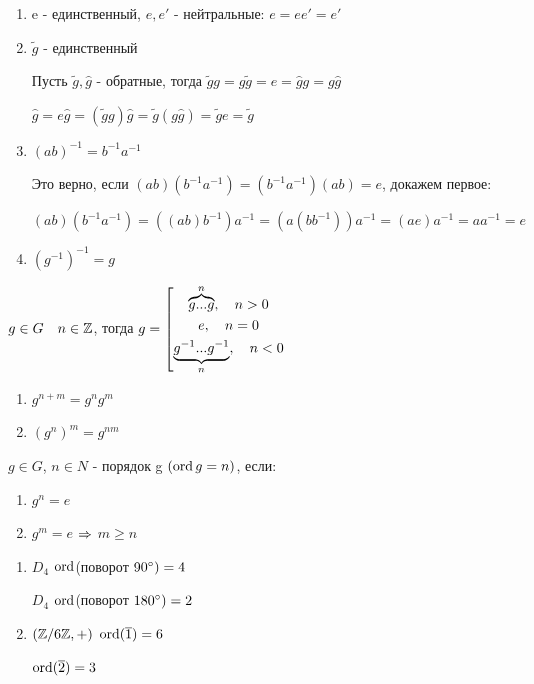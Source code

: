 \documentclass[12pt, fleqn]{article}
\begin{document}
\begin{properties}[групп]
    \begin{enumerate}
        \item e - единственный, $e,e'$ - нейтральные: $e=e e'=e'$
        \item $\widetilde{g}$ - единственный

        Пусть $\widetilde{g},\hat{g}$ - обратные, тогда $\widetilde{g}g = g\widetilde{g} = e = \hat{g}g = g\hat{g}$

        $\hat{g}=e \hat{g}=(\widetilde{g}g)\hat{g}=\widetilde{g}(g\hat{g})=\widetilde{g}e=\widetilde{g}$
        \item $(a b)^{-1}=b^{-1}a^{-1}$

        Это верно, если $(ab)(b^{-1}a^{-1})=(b^{-1}a^{-1})(ab)=e$, докажем первое:

        $(ab)(b^{-1}a^{-1})=((ab)b^{-1})a^{-1}=(a(b b^{-1}))a^{-1}=(a e)a^{-1}=a a^{-1}=e$
        \item $(g^{-1})^{-1}=g$
    \end{enumerate}
\end{properties}

\begin{definition}
    $g \in G \quad n \in \mathbb{Z}$, тогда $g=
\left[
  \begin{gathered}
    \overbrace{g...g}^n, \quad n>0\\
    e, \quad n=0\\
    \underbrace{g^{-1}...g^{-1}}_n, \quad n<0
  \end{gathered}
\right.$
\end{definition}

\begin{properties}[степени]
    \begin{enumerate}
    	\item $g^{n+m}=g^n g^m$
    	\item $(g^n)^m=g^{n m}$
	\end{enumerate}
\end{properties}

\begin{definition}
    $g \in G$, $n \in N$ - порядок g $(\mathop{\rm ord}\nolimits g = n)$, если:
    \begin{enumerate}
    	\item $g^n=e$
    	\item $g^m=e$ $\Rightarrow$ $m \geqslant n$
	\end{enumerate}
\end{definition}

\begin{example}
    \begin{enumerate}
    	\item $D_4$ $\mathop{\rm ord}\nolimits$(поворот $90\degree) =4$

    	$D_4$ $\mathop{\rm ord}\nolimits$(поворот $180\degree) =2$
    	\item $(\mathbb{Z} /6 \mathbb{Z}, +)$ $\mathop{\rm ord}\nolimits(\overline{1})=6$

    	$\mathop{\rm ord}\nolimits(\overline{2})=3$
	\end{enumerate}
\end{example}
\end{document}
